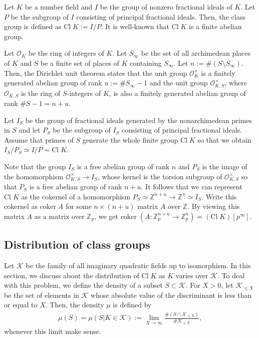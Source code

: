 \documentclass[12pt,reqno]{amsart}
\numberwithin{equation}{section}
\def\Z{{\mathbb Z}}
\def\sK{{\mathscr K}}
\def\sO{{\mathcal O}}
\begin{document}
Let $K$ be a number field and $I$ be the group of nonzero fractional ideals of $K$. Let $P$ be the subgroup of $I$ consisting of principal fractional ideals. Then, the class group is defined as $\text{Cl} \; K:=I/P$. It is well-known that $\text{Cl}\; K$ is a finite abelian group. 

Let $\sO_K$ be the ring of integers of $K$. Let $S_\infty$ be the set of all archimedean places of $K$ and $S$ be a finite set of places of $K$ containing $S_\infty$. Let $n:= \#(S \setminus S_\infty)$. Then, the Dirichlet unit theorem states that the unit group $\sO_K^\times$ is a finitely generated abelian group of rank $u:= \# S_\infty -1$ and the unit group $\sO_{K,S}^\times$, where $\sO_{K,S}$ is the ring of $S$-integers of $K$, is also a finitely generated abelian group of rank $\#S - 1 = n + u$. 

Let $I_S$ be the group of fractional ideals generated by the nonarchimedean primes in $S$ and let $P_S$ be the subgroup of $I_S$ consisting of principal fractional ideals. Assume that primes of $S$ generate the whole finite group $\text{Cl}\; K$ so that we obtain $I_S/P_S \simeq I/P = \text{Cl} \; K$.

Note that the group $I_S$ is a free abelian group of rank $n$ and $P_S$ is the image of the homomorphism $\sO_{K,S}^\times \to I_S$, whose kernel is the torsion subgroup of $\sO_{K,S}^\times$ so that $P_S$ is a free abelian group of rank $n+u$. It follows that we can represent $\text{Cl} \; K$ as the cokernel of a homomorphism $P_S \simeq \Z^{n+u} \to \Z^n \simeq I_S$. Write this cokernel as $\text{coker} \; A$ for some $n \times (n+u)$ matrix $A$ over $\Z$. By viewing this matrix $A$ as a matrix over $\Z_p$, we get $\text{coker} \; (A: \Z_p^{n+u} \to \Z_p^n) = (\text{Cl} \; K) [p^\infty]$.


\subsection{Distribution of class groups}

Let $\sK$ be the family of all imaginary quadratic fields up to isomorphism. In this section, we discuss about the distribution of $\text{Cl} \; K$ as $K$ varies over $\sK$. To deal with this problem, we define the density of a subset $S \subset \sK$. For $X>0$, let $\sK_{\le X}$ be the set of elements in $\sK$ whose absolute value of the discriminant is less than or equal to $X$. Then, the density $\mu$ is defined by
\begin{align*}
\mu(S) = \mu(S | K \in \sK) := \lim_{X \to \infty} \frac{\#(S \cap \sK_{\le X})}{\# \sK_{\le X}},
\end{align*}
whenever this limit make sense.
\end{document}
